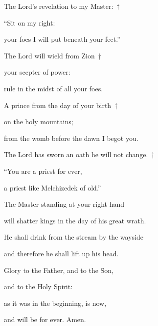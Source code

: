 \noindent The Lord’s revelation to my Master:~†~\nopagebreak

“Sit on my right:~\GreStar{}~\nopagebreak

your foes I will put beneath your feet.”

\noindent The Lord will wield from Zion~†~\nopagebreak

your scepter of power:~\GreStar{}~\nopagebreak

rule in the midst of all your foes.

\noindent A prince from the day of your birth~†~\nopagebreak

on the holy mountains;~\GreStar{}~\nopagebreak

from the womb before the dawn I begot you.

\noindent The Lord has sworn an oath he will not change.~†~\nopagebreak

“You are a priest for ever,~\GreStar{}~\nopagebreak

a priest like Melchizedek of old.”

\noindent The Master standing at your right hand~\GreStar{}~\nopagebreak

will shatter kings in the day of his great wrath.

\noindent He shall drink from the stream by the wayside~\GreStar{}~\nopagebreak

and therefore he shall lift up his head.

\noindent Glory to the Father, and to the Son,~\GreStar{}~\nopagebreak

and to the Holy Spirit:

\noindent as it was in the beginning, is now,~\GreStar{}~\nopagebreak

and will be for ever. Amen.
